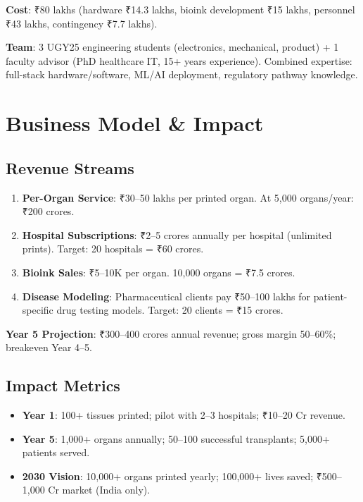\documentclass[11pt,a4paper]{article}
\begin{document}
\textbf{Cost}: ₹80 lakhs (hardware ₹14.3 lakhs, bioink development ₹15 lakhs, personnel ₹43 lakhs, contingency ₹7.7 lakhs).

\textbf{Team}: 3 UGY25 engineering students (electronics, mechanical, product) + 1 faculty advisor (PhD healthcare IT, 15+ years experience). Combined expertise: full-stack hardware/software, ML/AI deployment, regulatory pathway knowledge.

\section{Business Model \& Impact}

\subsection{Revenue Streams}

\begin{enumerate}
\item \textbf{Per-Organ Service}: ₹30--50 lakhs per printed organ. At 5,000 organs/year: ₹200 crores.
\item \textbf{Hospital Subscriptions}: ₹2--5 crores annually per hospital (unlimited prints). Target: 20 hospitals = ₹60 crores.
\item \textbf{Bioink Sales}: ₹5--10K per organ. 10,000 organs = ₹7.5 crores.
\item \textbf{Disease Modeling}: Pharmaceutical clients pay ₹50--100 lakhs for patient-specific drug testing models. Target: 20 clients = ₹15 crores.
\end{enumerate}

\textbf{Year 5 Projection}: ₹300--400 crores annual revenue; gross margin 50--60\%; breakeven Year 4--5.

\subsection{Impact Metrics}

\begin{itemize}
\item \textbf{Year 1}: 100+ tissues printed; pilot with 2--3 hospitals; ₹10--20 Cr revenue.
\item \textbf{Year 5}: 1,000+ organs annually; 50--100 successful transplants; 5,000+ patients served.
\item \textbf{2030 Vision}: 10,000+ organs printed yearly; 100,000+ lives saved; ₹500--1,000 Cr market (India only).
\end{itemize}
\end{document}
